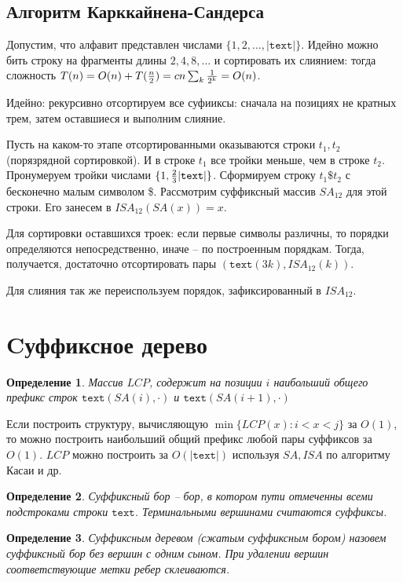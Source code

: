 \documentclass[10pt]{book}
\theoremstyle{plain}
\newtheorem{definition}{Определение}[section]
\newcommand{\textm}{\texttt{text}}
\begin{document}
\subsection{Алгоритм Карккайнена-Сандерса}

Допустим, что алфавит представлен числами $\{1,2,\ldots,|\textm|\}$.
Идейно можно бить строку на фрагменты длины $2, 4, 8, \ldots$ и сортировать
их слиянием: тогда сложность
$T(n) = O(n) + T({n \over 2}) = cn \sum_k {1 \over 2^k} = O(n)$.

Идейно: рекурсивно отсортируем все суфииксы: сначала на позициях не кратных
трем, затем оставшиеся и выполним слияние.

Пусть на каком-то этапе
отсортированными оказываются строки $t_1, t_2$ (порязрядной сортировкой).
И в строке $t_1$ все тройки меньше, чем в строке $t_2$. Пронумеруем тройки
числами $\{1, {2 \over 3}|\textm|\}$. Сформируем строку $t_1 \$ t_2$ с
бесконечно малым символом \$. Рассмотрим суффиксный массив $SA_{12}$ для этой
строки. Его занесем в $ISA_{12}(SA(x)) = x$.

Для сортировки оставшихся троек: если первые символы различны, то порядки
определяются непосредственно, иначе -- по построенным порядкам. Тогда,
получается, достаточно отсортировать пары $(\textm(3k), ISA_{12}(k))$.

Для слияния так же переиспользуем порядок, зафиксированный в $ISA_{12}$.

\section{Cуффиксное дерево}

\begin{definition}
  Массив $LCP$, содержит на позиции $i$ наибольший общего префикс строк
  $\textm(SA(i), \cdot)$ и $\textm(SA(i + 1), \cdot)$
\end{definition}

Если построить структуру,
вычисляющую $\min \{ LCP(x) : i < x < j \}$ за $O(1)$, то можно построить
наибольший общий префикс любой пары суффиксов за $O(1)$. $LCP$ можно построить
за $O(|\textm|)$ используя $SA, ISA$ по алгоритму Касаи и др.

\begin{definition}
  Суффиксный бор -- бор, в котором пути отмеченны всеми подстроками строки
  $\textm$. Терминальными вершинами считаются суффиксы.
\end{definition}

\begin{definition}
  Суффиксным деревом (сжатым суффиксным бором) назовем суффиксный бор без
  вершин с одним сыном. При удалении вершин соответствующие метки ребер
  склеиваются.
\end{definition}
\end{document}
